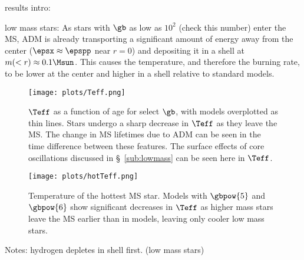 results intro:

low mass stars: As stars with $\gb$ as low as $10^2$ (check this number) enter the MS, ADM is already transporting a significant amount of energy away from the center ($\epsx \approx \epspp$ near $r=0$) and depositing it in a shell at $m(<r) \approx 0.1 \Msun$. This causes the temperature, and therefore the burning rate, to be lower at the center and higher in a shell relative to standard models.


\begin{figure*}
  \centering
  \texttt{[image: plots/Teff.png]}
  \caption{$\Teff$ as a function of age for select $\gb$, with \nodm models overplotted as thin lines. Stars undergo a sharp decrease in $\Teff$ as they leave the MS. The change in MS lifetimes due to ADM can be seen in the time difference between these features. The surface effects of core oscillations discussed in \S~\ref{sub:lowmass} can be seen here in $\Teff$.
  }
  \label{fig:Teff}
\end{figure*}



\begin{figure*}
  \centering
  \texttt{[image: plots/hotTeff.png]}
  \caption{
  Temperature of the hottest MS star. Models with $\gbpow{5}$ and $\gbpow{6}$ show significant decreases in $\Teff$ as higher mass stars leave the MS earlier than in \nodm models, leaving only cooler low mass stars.
  }
  \label{fig:hotTeff}

\end{figure*}




Notes:
hydrogen depletes in shell first. (low mass stars)
